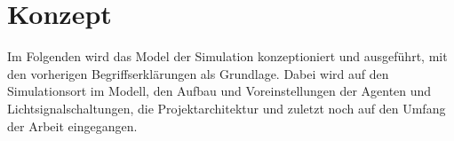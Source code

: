 %


\chapter{Konzept}\label{ch:konzept}

Im Folgenden wird das Model der Simulation konzeptioniert und ausgeführt, mit den vorherigen Begriffserklärungen als Grundlage.
Dabei wird auf den Simulationsort im Modell, den Aufbau und Voreinstellungen der Agenten und Lichtsignalschaltungen, die Projektarchitektur und zuletzt noch auf den Umfang der Arbeit eingegangen.








